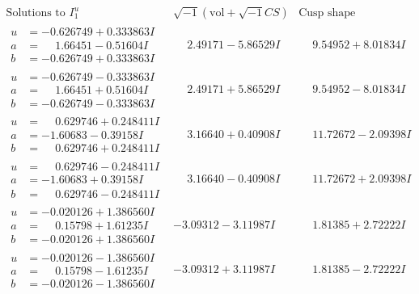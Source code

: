 \documentclass[1p]{elsarticle_modified}
\theoremstyle{definition}
\newcommand{\I}{\sqrt{-1}}
\begin{document}
$$\begin{array}{c|c|c}  
\text{Solutions to }I^u_{1}& \I (\text{vol} + \sqrt{-1}CS) & \text{Cusp shape}\\
 \hline 
\begin{aligned}
u &= -0.626749 + 0.333863 I \\
a &= \phantom{-}1.66451 - 0.51604 I \\
b &= -0.626749 + 0.333863 I\end{aligned}
 & \phantom{-}2.49171 - 5.86529 I & \phantom{-}9.54952 + 8.01834 I \\ \hline\begin{aligned}
u &= -0.626749 - 0.333863 I \\
a &= \phantom{-}1.66451 + 0.51604 I \\
b &= -0.626749 - 0.333863 I\end{aligned}
 & \phantom{-}2.49171 + 5.86529 I & \phantom{-}9.54952 - 8.01834 I \\ \hline\begin{aligned}
u &= \phantom{-}0.629746 + 0.248411 I \\
a &= -1.60683 - 0.39158 I \\
b &= \phantom{-}0.629746 + 0.248411 I\end{aligned}
 & \phantom{-}3.16640 + 0.40908 I & \phantom{-}11.72672 - 2.09398 I \\ \hline\begin{aligned}
u &= \phantom{-}0.629746 - 0.248411 I \\
a &= -1.60683 + 0.39158 I \\
b &= \phantom{-}0.629746 - 0.248411 I\end{aligned}
 & \phantom{-}3.16640 - 0.40908 I & \phantom{-}11.72672 + 2.09398 I \\ \hline\begin{aligned}
u &= -0.020126 + 1.386560 I \\
a &= \phantom{-}0.15798 + 1.61235 I \\
b &= -0.020126 + 1.386560 I\end{aligned}
 & -3.09312 - 3.11987 I & \phantom{-}1.81385 + 2.72222 I \\ \hline\begin{aligned}
u &= -0.020126 - 1.386560 I \\
a &= \phantom{-}0.15798 - 1.61235 I \\
b &= -0.020126 - 1.386560 I\end{aligned}
 & -3.09312 + 3.11987 I & \phantom{-}1.81385 - 2.72222 I \\ \hline\begin{aligned}

\end{aligned}
\end{array}$$
\end{document}
